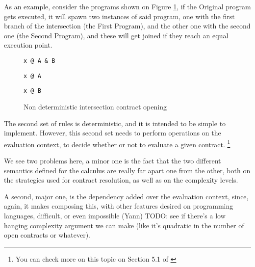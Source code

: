 \documentclass[sigplan,10pt,review,anonymous]{acmart}
\newcommand{\resolved}[2]{}
\begin{document}
As an example, consider the programs shown on Figure
\ref{fig:kt-non-deterministic}, if the Original program
gets executed, it will spawn two instances of said program,
one with the first branch of the intersection (the First Program),
and the other one with the second one (the Second Program),
and these will get joined if they reach an equal execution point.

\begin{figure}[h]
\begin{lstlisting}[language=nickel, title=Original]
x @ A & B
\end{lstlisting}
\begin{lstlisting}[language=nickel, title=First Program]
x @ A
\end{lstlisting}
\begin{lstlisting}[language=nickel, title=Second Program]
x @ B
\end{lstlisting}
\caption{Non deterministic intersection contract opening}
\label{fig:kt-non-deterministic}
\end{figure}


The second set of rules is deterministic, and it is intended
to be simple to implement.
However, this second set needs to perform operations
on the evaluation context, to decide whether or not to evaluate
a given contract.
\footnote{You can check more on this topic on Section 5.1 of
\cite{KeilThiemannUnionIntersection}}

We see two problems here, a minor one is the fact that the two
different semantics defined for the calculus are really far apart
one from the other, both on the strategies used for contract resolution,
as well as on the complexity levels.
\resolved{(Yann) Is it really a
    problem per se? It is common thing to do (a nice declarative system
    for proofs and an algorithmic one for implementation, proved equivalent).
    Maybe the point is that the algorithmic system is way more complex than the
declarative one
(Teo) reworded}.
A second, major one,
is the dependency added over the evaluation context, since, again,
it makes composing this, with other features desired on programming languages,
difficult, or even impossible
\resolved{(Yann) I think we need to substantiate this claim. If this
context dependency explains why CSE is invalid, maybe have a little example?
(Teo) I removed it, I don't think there's an example, mainly since
this context dependency is not part of the language. I do think it complicates
implementation of said feature}
\todo{(Yann) TODO: see if there's a low hanging complexity
    argument we can make (like it's quadratic in the number of open contracts or
whatever)}.
\end{document}
